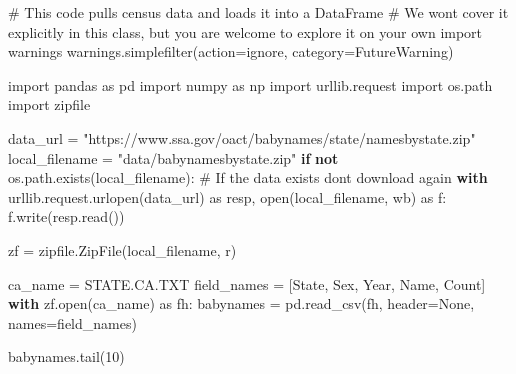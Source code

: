 \documentclass[
  letterpaper,
  DIV=11,
  numbers=noendperiod]{scrreprt}
\newenvironment{Shaded}{\begin{snugshade}}{\end{snugshade}}
\newcommand{\BuiltInTok}[1]{\textcolor[rgb]{0.00,0.23,0.31}{#1}}
\newcommand{\CommentTok}[1]{\textcolor[rgb]{0.37,0.37,0.37}{#1}}
\newcommand{\ControlFlowTok}[1]{\textcolor[rgb]{0.00,0.23,0.31}{\textbf{#1}}}
\newcommand{\DecValTok}[1]{\textcolor[rgb]{0.68,0.00,0.00}{#1}}
\newcommand{\ImportTok}[1]{\textcolor[rgb]{0.00,0.46,0.62}{#1}}
\newcommand{\KeywordTok}[1]{\textcolor[rgb]{0.00,0.23,0.31}{\textbf{#1}}}
\newcommand{\NormalTok}[1]{\textcolor[rgb]{0.00,0.23,0.31}{#1}}
\newcommand{\OperatorTok}[1]{\textcolor[rgb]{0.37,0.37,0.37}{#1}}
\newcommand{\PreprocessorTok}[1]{\textcolor[rgb]{0.68,0.00,0.00}{#1}}
\newcommand{\StringTok}[1]{\textcolor[rgb]{0.13,0.47,0.30}{#1}}
\newcommand{\VariableTok}[1]{\textcolor[rgb]{0.07,0.07,0.07}{#1}}
\begin{document}
\begin{Shaded}
\begin{Highlighting}[]
\CommentTok{\# This code pulls census data and loads it into a DataFrame}
\CommentTok{\# We won\textquotesingle{}t cover it explicitly in this class, but you are welcome to explore it on your own}
\ImportTok{import}\NormalTok{ warnings}
\NormalTok{warnings.simplefilter(action}\OperatorTok{=}\StringTok{\textquotesingle{}ignore\textquotesingle{}}\NormalTok{, category}\OperatorTok{=}\PreprocessorTok{FutureWarning}\NormalTok{)}

\ImportTok{import}\NormalTok{ pandas }\ImportTok{as}\NormalTok{ pd}
\ImportTok{import}\NormalTok{ numpy }\ImportTok{as}\NormalTok{ np}
\ImportTok{import}\NormalTok{ urllib.request}
\ImportTok{import}\NormalTok{ os.path}
\ImportTok{import}\NormalTok{ zipfile}

\NormalTok{data\_url }\OperatorTok{=} \StringTok{"https://www.ssa.gov/oact/babynames/state/namesbystate.zip"}
\NormalTok{local\_filename }\OperatorTok{=} \StringTok{"data/babynamesbystate.zip"}
\ControlFlowTok{if} \KeywordTok{not}\NormalTok{ os.path.exists(local\_filename): }\CommentTok{\# If the data exists don\textquotesingle{}t download again}
    \ControlFlowTok{with}\NormalTok{ urllib.request.urlopen(data\_url) }\ImportTok{as}\NormalTok{ resp, }\BuiltInTok{open}\NormalTok{(local\_filename, }\StringTok{\textquotesingle{}wb\textquotesingle{}}\NormalTok{) }\ImportTok{as}\NormalTok{ f:}
\NormalTok{        f.write(resp.read())}

\NormalTok{zf }\OperatorTok{=}\NormalTok{ zipfile.ZipFile(local\_filename, }\StringTok{\textquotesingle{}r\textquotesingle{}}\NormalTok{)}

\NormalTok{ca\_name }\OperatorTok{=} \StringTok{\textquotesingle{}STATE.CA.TXT\textquotesingle{}}
\NormalTok{field\_names }\OperatorTok{=}\NormalTok{ [}\StringTok{\textquotesingle{}State\textquotesingle{}}\NormalTok{, }\StringTok{\textquotesingle{}Sex\textquotesingle{}}\NormalTok{, }\StringTok{\textquotesingle{}Year\textquotesingle{}}\NormalTok{, }\StringTok{\textquotesingle{}Name\textquotesingle{}}\NormalTok{, }\StringTok{\textquotesingle{}Count\textquotesingle{}}\NormalTok{]}
\ControlFlowTok{with}\NormalTok{ zf.}\BuiltInTok{open}\NormalTok{(ca\_name) }\ImportTok{as}\NormalTok{ fh:}
\NormalTok{    babynames }\OperatorTok{=}\NormalTok{ pd.read\_csv(fh, header}\OperatorTok{=}\VariableTok{None}\NormalTok{, names}\OperatorTok{=}\NormalTok{field\_names)}

\NormalTok{babynames.tail(}\DecValTok{10}\NormalTok{)}
\end{Highlighting}
\end{Shaded}
\end{document}

